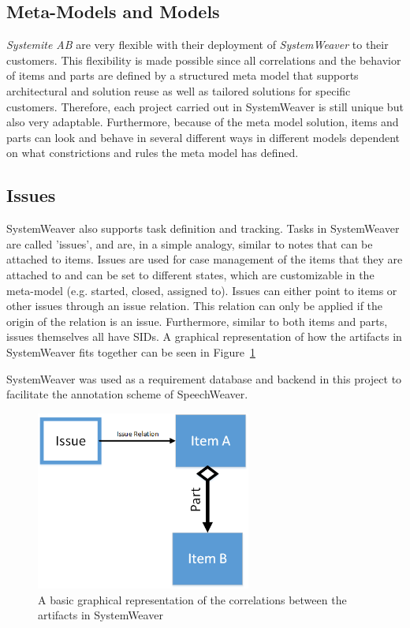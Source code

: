 \subsection{Meta-Models and Models}
\label{subsec:mmandm}
\emph{Systemite AB} are very flexible with their deployment of \emph{SystemWeaver} to their customers. This flexibility is made possible since all correlations and the behavior of items and parts are defined by a structured meta model that supports architectural and solution reuse as well as tailored solutions for specific customers.
Therefore, each project carried out in SystemWeaver is still unique but also very adaptable. 
Furthermore, because of the meta model solution, items and parts can look and behave in several different ways in different models dependent on what constrictions and rules the meta model has defined.

\subsection{Issues}
\label{subsec:issue}
SystemWeaver also supports task definition and tracking.
Tasks in SystemWeaver are called 'issues', and are, in a simple analogy, similar to notes that can be attached to items. 
Issues are used for case management of the items that they are attached to and can be set to different states, which are customizable in the meta-model (e.g. started, closed, assigned to). 
Issues can either point to items or other issues through an issue relation.
This relation can only be applied if the origin of the relation is an issue. Furthermore, similar to both items and parts, issues themselves all have SIDs. A graphical representation of how the artifacts in SystemWeaver fits together can be seen in Figure~\ref{fig:sysw}

SystemWeaver was used as a requirement database and backend in this project to facilitate the annotation scheme of SpeechWeaver.

\begin{figure}[h]
\centering
\includegraphics[width = 200pt, keepaspectratio = true]{fig/itemspartissuerelation}
\caption{A basic graphical representation of the correlations between the artifacts in SystemWeaver}
\label{fig:sysw}
\end{figure}


